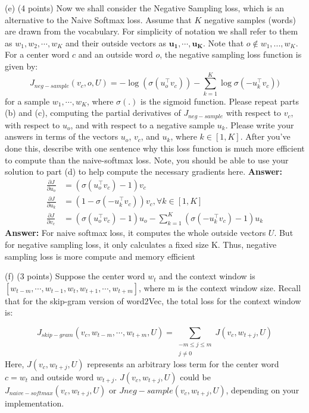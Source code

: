 \documentclass{article}
\begin{document}
\noindent(e)  (4 points) Now we shall consider the Negative Sampling loss, which is an alternative to the Naive Softmax loss. Assume that $K$ negative samples (words) are drawn from the vocabulary. For simplicity of notation we shall refer to them as $w_1, w_2, \cdots,w_K$ and their outside vectors as $\mathbf{u_1},\cdots,\mathbf{u_K}$. Note that $o \not\in {w_1,...,w_K}$.  For a center word $c$ and an outside word $o$, the negative sampling loss function is given by:
$$J_{neg-sample}(v_c, o, U) = -\log (\sigma (u_o^\intercal v_c)) - \sum_{k=1}^{K} \log \sigma(-u_k^\intercal v_c))$$
for a sample $w_1,\cdots,w_K$, where $\sigma(.)$ is the sigmoid function.
\smallbreak
Please repeat parts (b) and (c), computing the partial derivatives of $J_{neg-sample}$ with respect to $v_c$, with respect to $u_o$, and with respect  to a negative sample $u_k$. Please write your answers in terms of the vectors $u_o$, $v_c$, and $u_k$, where $k \in [1, K]$. After you’ve done this, describe with one sentence why this loss function is much more efficient to compute than the naive-softmax loss. Note, you should be able to use your solution to part (d) to help compute the necessary gradients here.
\bigbreak
\noindent
\textbf{Answer:}
\begin{align*}
\frac{\partial J}{\partial u_o} &= (\sigma(u_o^\intercal v_c) - 1)v_c \\
\frac{\partial J}{\partial u_k} &= (1 - \sigma(-u_k^\intercal v_c))v_c, \forall k \in [1, K] \\
\frac{\partial J}{\partial v_c} &=  (\sigma(u_o^\intercal v_c) - 1)u_o - \sum_{k=1}^{K}(\sigma(-u_k^\intercal v_c)-1)u_k
\end{align*}
\textbf{Answer:} For naive softmax loss, it computes the whole outside vectors $U$.  But for negative sampling loss, it only calculates a fixed size K. Thus, negative sampling loss is more compute and memory efficient
\bigbreak

\noindent(f)  (3 points) Suppose the center word $w_t$ and the context window is $[w_{t-m}, \cdots, w_{t-1}, w_t, w_{t+1}, \cdots, w_{t+m}]$, where m is the context window size. Recall that for the skip-gram version of word2Vec, the total loss for the context window is:

\begin{equation}
J_{skip-gram}(v_c, w_{t-m}, \cdots, w_{t+m}, U) = \sum_{\substack{-m \leq j \leq m \\ j\ne 0}} J(v_c, w_{t+j}, U)
\end{equation}
Here, $J(v_c, w_{t+j}, U)$ represents an arbitrary loss term for the center word $c = w_t$ and outside word $w_{t+j}$. $J(v_c, w_{t+j}, U)$ could be $J_{naive-softmax}(v_c, w_{t+j}, U)$ or $J{neg-sample}(v_c, w_{t+j}, U)$, depending on your implementation.
\end{document}
